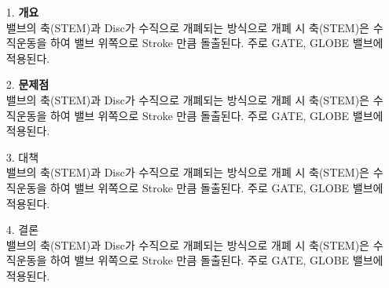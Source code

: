 \documentclass[12pt,a4paper,oneside]{book}
\begin{document}
		\begin{itemize}[	leftmargin=0.0em, 
						rightmargin=0.0em, 
						labelwidth=0.0em, 
						labelsep=2.0em,
						itemsep=0.0em ]
		\item[1.] \textbf{개요}\\
	밸브의 축(STEM)과 Disc가 수직으로 개폐되는 방식으로 개폐 시 축(STEM)은 수직운동을 하여 밸브 위쪽으로 Stroke 만큼 돌출된다. 
	주로 GATE, GLOBE 밸브에 적용된다.
	
		\item[2.] \textbf{문제점}\\
	밸브의 축(STEM)과 Disc가 수직으로 개폐되는 방식으로 개폐 시 축(STEM)은 수직운동을 하여 밸브 위쪽으로 Stroke 만큼 돌출된다. 
	주로 GATE, GLOBE 밸브에 적용된다.
	
		\item[3.] 대책	\\
	밸브의 축(STEM)과 Disc가 수직으로 개폐되는 방식으로 개폐 시 축(STEM)은 수직운동을 하여 밸브 위쪽으로 Stroke 만큼 돌출된다. 
	주로 GATE, GLOBE 밸브에 적용된다.
	
		\item[4.] 결론\\
	밸브의 축(STEM)과 Disc가 수직으로 개폐되는 방식으로 개폐 시 축(STEM)은 수직운동을 하여 밸브 위쪽으로 Stroke 만큼 돌출된다. 
	주로 GATE, GLOBE 밸브에 적용된다.
	
		\end{itemize}
	
	
	

		\newpage
	
	
		\thispagestyle{empty}
		\begin{center}
		\Large
		\end{center}
	
\end{document}
